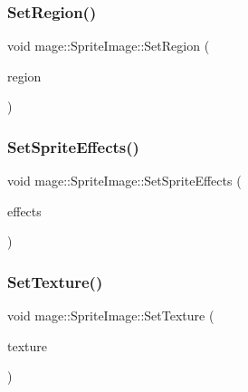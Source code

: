 \hypertarget{classmage_1_1_sprite_image_a20b1e451e3948a2ce6205ae6119d4531}{}\label{classmage_1_1_sprite_image_a20b1e451e3948a2ce6205ae6119d4531} 
\subsubsection{\texorpdfstring{Set\+Region()}{SetRegion()}}
{\footnotesize\ttfamily void mage\+::\+Sprite\+Image\+::\+Set\+Region (\begin{DoxyParamCaption}\item[{const R\+E\+CT \&}]{region }\end{DoxyParamCaption})}

\hypertarget{classmage_1_1_sprite_image_a8f3aab311ee05b38daba8a0fa68d30ad}{}\label{classmage_1_1_sprite_image_a8f3aab311ee05b38daba8a0fa68d30ad} 
\subsubsection{\texorpdfstring{Set\+Sprite\+Effects()}{SetSpriteEffects()}}
{\footnotesize\ttfamily void mage\+::\+Sprite\+Image\+::\+Set\+Sprite\+Effects (\begin{DoxyParamCaption}\item[{\hyperlink{namespacemage_a9cfe18123066ba4236f548f9de75d881}{Sprite\+Effect}}]{effects }\end{DoxyParamCaption})}

\hypertarget{classmage_1_1_sprite_image_a12e0ffecc7995f13ccf0374fa37dc4c6}{}\label{classmage_1_1_sprite_image_a12e0ffecc7995f13ccf0374fa37dc4c6} 
\subsubsection{\texorpdfstring{Set\+Texture()}{SetTexture()}}
{\footnotesize\ttfamily void mage\+::\+Sprite\+Image\+::\+Set\+Texture (\begin{DoxyParamCaption}\item[{\hyperlink{namespacemage_a1e01ae66713838a7a67d30e44c67703e}{Shared\+Ptr}$<$ \hyperlink{classmage_1_1_texture}{Texture} $>$}]{texture }\end{DoxyParamCaption})}




